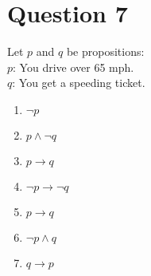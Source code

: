 \documentclass[12pt]{extarticle}
\begin{document}
	\clearpage

\section*{Question 7}
	Let $p$ and $q$ be propositions:\\
		\hspace*{1cm}$p$: You drive over 65 mph.\\
		\hspace*{1cm}$q$: You get a speeding ticket.\\
	\begin{enumerate}
		\item $\neg p$
		\item $p \wedge \neg q$
		\item $p \to q$
		\item $\neg p \to \neg q$
		\item $p \to q$
		\item $\neg p \wedge q$
		\item $q \to p$
	\end{enumerate}
\clearpage
\end{document}
